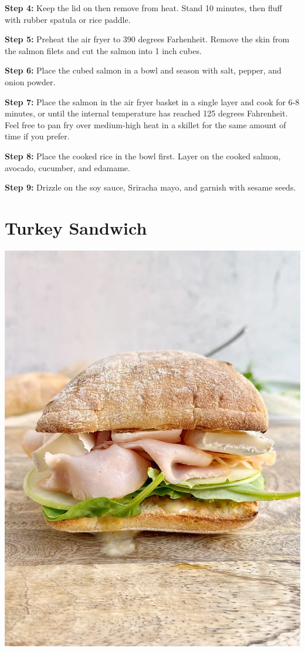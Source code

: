 \documentclass[
]{book}
\begin{document}
\textbf{Step 4:} Keep the lid on then remove from heat. Stand 10
minutes, then fluff with rubber spatula or rice paddle.

\textbf{Step 5:} Preheat the air fryer to 390 degrees Farhenheit. Remove
the skin from the salmon filets and cut the salmon into 1 inch cubes.

\textbf{Step 6:} Place the cubed salmon in a bowl and season with salt,
pepper, and onion powder.

\textbf{Step 7:} Place the salmon in the air fryer basket in a single
layer and cook for 6-8 minutes, or until the internal temperature has
reached 125 degrees Fahrenheit. Feel free to pan fry over medium-high
heat in a skillet for the same amount of time if you prefer.

\textbf{Step 8:} Place the cooked rice in the bowl first. Layer on the
cooked salmon, avocado, cucumber, and edamame.

\textbf{Step 9:} Drizzle on the soy sauce, Sriracha mayo, and garnish
with sesame seeds.

\section*{Turkey Sandwich}\label{turkey-sandwich}

\includegraphics{ts.jpg}
\end{document}
